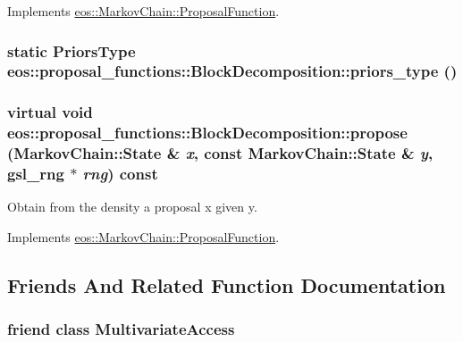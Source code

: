 Implements \hyperlink{structeos_1_1MarkovChain_1_1ProposalFunction_ae3f2c43980ec9dfe9f35d8139f2f4ec7}{eos::MarkovChain::ProposalFunction}.\hypertarget{classeos_1_1proposal__functions_1_1BlockDecomposition_a1dc4342c37838cf8d87f5c64c2f02f66}{
\subsubsection[{priors\_\-type}]{\setlength{\rightskip}{0pt plus 5cm}static {\bf PriorsType} eos::proposal\_\-functions::BlockDecomposition::priors\_\-type ()}}
\label{classeos_1_1proposal__functions_1_1BlockDecomposition_a1dc4342c37838cf8d87f5c64c2f02f66}
\hypertarget{classeos_1_1proposal__functions_1_1BlockDecomposition_a5b0a6e997f1c78d2557f2a742c4d3813}{
\subsubsection[{propose}]{\setlength{\rightskip}{0pt plus 5cm}virtual void eos::proposal\_\-functions::BlockDecomposition::propose ({\bf MarkovChain::State} \& {\em x}, \/  const {\bf MarkovChain::State} \& {\em y}, \/  gsl\_\-rng $\ast$ {\em rng}) const}}
\label{classeos_1_1proposal__functions_1_1BlockDecomposition_a5b0a6e997f1c78d2557f2a742c4d3813}


Obtain from the density a proposal x given y. 

Implements \hyperlink{structeos_1_1MarkovChain_1_1ProposalFunction_a2b296008d32b1cd008e59cde1228705f}{eos::MarkovChain::ProposalFunction}.

\subsection{Friends And Related Function Documentation}
\hypertarget{classeos_1_1proposal__functions_1_1BlockDecomposition_a52a0d4a7b6284023493999008d416bfe}{
\subsubsection[{MultivariateAccess}]{\setlength{\rightskip}{0pt plus 5cm}friend class {\bf MultivariateAccess}}}
\label{classeos_1_1proposal__functions_1_1BlockDecomposition_a52a0d4a7b6284023493999008d416bfe}


